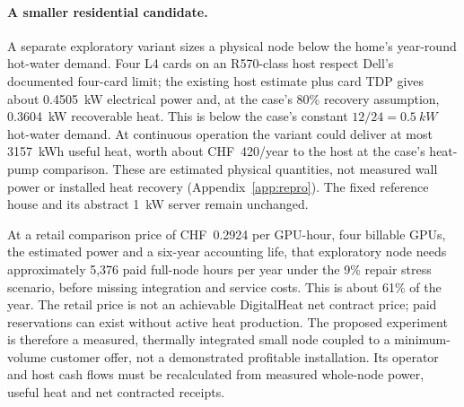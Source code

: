 \paragraph{A smaller residential candidate.} A separate exploratory variant sizes a physical
node below the home's year-round hot-water demand. Four L4 cards on an R570-class host respect
Dell's documented four-card limit; the existing host estimate plus card TDP gives about
\qty{0.4505}{kW} electrical power and, at the case's 80\% recovery assumption,
\qty{0.3604}{kW} recoverable heat. This is below the case's constant
$12/24=\qty{0.5}{kW}$ hot-water demand. At continuous operation the variant could deliver at
most \qty{3157}{kWh} useful heat, worth about CHF~420/year to the host at the case's heat-pump
comparison. These are estimated physical quantities, not measured wall power or installed heat
recovery (Appendix~\ref{app:repro}). The fixed reference house and
its abstract \qty{1}{kW} server remain unchanged.

At a retail comparison price of CHF~0.2924 per GPU-hour, four billable GPUs, the estimated
power and a six-year accounting life, that exploratory node needs approximately 5,376 paid
full-node hours per year under the 9\% repair stress scenario, before missing integration and
service costs. This is about 61\% of the year. The retail price is not an achievable DigitalHeat
net contract price; paid reservations can exist without active heat production. The proposed
experiment is therefore a measured, thermally integrated small node coupled to a minimum-volume
customer offer, not a demonstrated profitable installation. Its operator and host cash flows must
be recalculated from measured whole-node power, useful heat and net contracted receipts.
